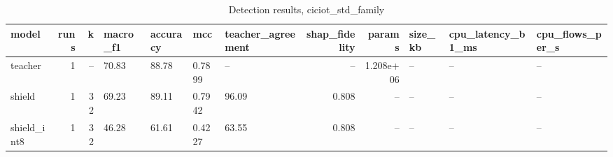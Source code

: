 \begin{table}
\caption{Detection results, ciciot_std_family}
\begin{tabular}{lrrllllrrlll}
\toprule
model & runs & k & macro_f1 & accuracy & mcc & teacher_agreement & shap_fidelity & params & size_kb & cpu_latency_b1_ms & cpu_flows_per_s \\
\midrule
teacher & 1 & -- & 70.83 & 88.78 & 0.7899 & -- & -- & 1.208e+06 & -- & -- & -- \\
shield & 1 & 32 & 69.23 & 89.11 & 0.7942 & 96.09 & 0.808 & -- & -- & -- & -- \\
shield_int8 & 1 & 32 & 46.28 & 61.61 & 0.4227 & 63.55 & 0.808 & -- & -- & -- & -- \\
\bottomrule
\end{tabular}
\end{table}
